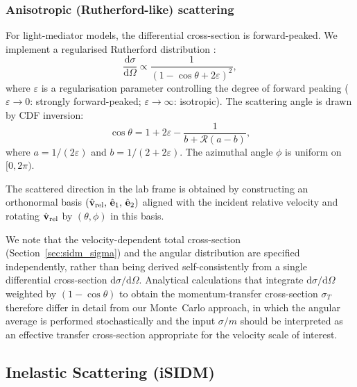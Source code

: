 \documentclass[fleqn,usenatbib]{mnras}
\begin{document}
\subsubsection{Anisotropic (Rutherford-like) scattering}
\label{sec:sidm_anisotropic}

For light-mediator models, the differential cross-section is
forward-peaked.  We implement a regularised Rutherford distribution
\citep{Kahlhoefer2014,Robertson2017}:
\begin{equation}
\frac{\mathrm{d}\sigma}{\mathrm{d}\Omega}
  \propto \frac{1}{(1 - \cos\theta + 2\varepsilon)^2},
\label{eq:rutherford}
\end{equation}
where $\varepsilon$ is a regularisation parameter controlling the
degree of forward peaking ($\varepsilon \to 0$: strongly
forward-peaked; $\varepsilon \to \infty$: isotropic).  The scattering
angle is drawn by CDF inversion:
\begin{equation}
\cos\theta = 1 + 2\varepsilon
  - \frac{1}{b + \mathcal{R}(a - b)},
\label{eq:rutherford_sample}
\end{equation}
where $a = 1/(2\varepsilon)$ and $b = 1/(2+2\varepsilon)$.  The
azimuthal angle $\phi$ is uniform on $[0,2\pi)$.

The scattered direction in the lab frame is obtained by constructing
an orthonormal basis $(\hat{\mathbf{v}}_{\rm rel},\,\hat{\mathbf{e}}_1,\,
\hat{\mathbf{e}}_2)$ aligned with the incident relative velocity and
rotating $\hat{\mathbf{v}}_{\rm rel}$ by $(\theta,\phi)$ in this
basis.

We note that the velocity-dependent total cross-section
(Section~\ref{sec:sidm_sigma}) and the angular distribution are
specified independently, rather than being derived self-consistently
from a single differential cross-section
$\mathrm{d}\sigma/\mathrm{d}\Omega$.  Analytical calculations that
integrate $\mathrm{d}\sigma/\mathrm{d}\Omega$ weighted by
$(1-\cos\theta)$ to obtain the momentum-transfer cross-section
$\sigma_T$ \citep{Girmohanta2022} therefore differ in detail from our
Monte~Carlo approach, in which the angular average is performed
stochastically and the input $\sigma/m$ should be interpreted as an
effective transfer cross-section appropriate for the velocity scale
of interest.

\subsection{Inelastic Scattering (iSIDM)}
\label{sec:sidm_inelastic}
\end{document}
